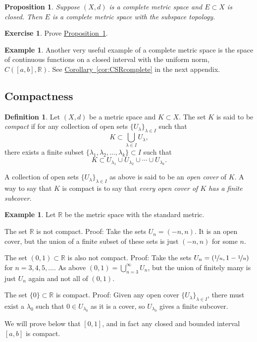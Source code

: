 \documentclass[12pt,openany]{book}
\newcommand{\R}{{\mathbb{R}}}
\newcommand{\myindex}[1]{#1\index{#1}}
\theoremstyle{plain}
\newtheorem{prop}[thm]{Proposition}
\theoremstyle{remark}
\theoremstyle{definition}
\newtheorem{defn}[thm]{Definition}
\newenvironment{exbox}{%
    \def\FrameCommand{\vrule width 1pt \relax\hspace{10pt}}%
    \MakeFramed{\advance\hsize-\width\FrameRestore}%
}{%
    \endMakeFramed
}
\theoremstyle{exercise}
\newtheorem{exercise}{Exercise}[section]
\theoremstyle{example}
\newtheorem{example}[thm]{Example}
\newcommand{\propref}[1]{\hyperref[#1]{Proposition~\ref*{#1}}}
\newcommand{\corref}[1]{\hyperref[#1]{Corollary~\ref*{#1}}}
\begin{document}
\begin{prop} \label{prop:closedcomplete}
Suppose $(X,d)$ is a complete metric space and $E \subset X$
is closed.  Then $E$ is a complete metric space with the subspace topology.
\end{prop}

\begin{exbox}
\begin{exercise}%
Prove \propref{prop:closedcomplete}.
\end{exercise}
\end{exbox}

\begin{example}
Another very useful example of a complete metric space is the space of
continuous functions on a closed interval with the uniform norm, $C([a,b],\R)$.
See \corref{cor:CSRcomplete} in the next appendix.
\end{example}

\subsection{Compactness}

\begin{defn}
Let $(X,d)$ be a metric space and $K \subset X$. 
The set $K$ is said to be \emph{\myindex{compact}}
if for any collection
of open sets $\{ U_{\lambda} \}_{\lambda \in I}$ such that
\begin{equation*}
K \subset \bigcup_{\lambda \in I} U_\lambda ,
\end{equation*}
there exists a finite subset
$\{ \lambda_1, \lambda_2,\ldots,\lambda_k \} \subset I$
such that
\begin{equation*}
K \subset U_{\lambda_1} \cup U_{\lambda_2} \cup \cdots \cup U_{\lambda_k} .
\end{equation*}
\end{defn}

A collection of open sets $\{ U_{\lambda} \}_{\lambda \in I}$ as above is
said to be an \emph{\myindex{open cover}} of $K$.  A way to say that
$K$ is compact is to say that \emph{every open cover of $K$ has a finite
\myindex{subcover}}.

\begin{example}
Let $\R$ be the metric space with the standard metric.

The set $\R$ is not compact.  Proof: Take the sets $U_n = (-n,n)$.
It is an open cover, but the union of a finite subset of these sets
is just $(-n,n)$ for some $n$.

The set $(0,1) \subset \R$ is also not compact.  Proof:  Take the 
sets $U_{n} = (\nicefrac{1}{n},1-\nicefrac{1}{n})$ for $n=3,4,5,\ldots$.
As above $(0,1) = \bigcup_{n=3}^\infty U_n$, but the union of finitely many
is just $U_n$ again and not all of $(0,1)$.

The set $\{ 0 \} \subset \R$ is compact.  Proof: Given any open cover $\{
U_{\lambda} \}_{\lambda \in I}$, there must exist a $\lambda_0$ such that $0
\in U_{\lambda_0}$ as it is a cover, so $U_{\lambda_0}$ gives a
finite subcover.

We will prove below that $[0,1]$, and in fact any closed and bounded
interval $[a,b]$ is compact.
\end{example}
\end{document}
